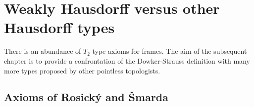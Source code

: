 \chapter{Weakly Hausdorff versus other Hausdorff types}

There is an abundance of $T_2$-type axioms for frames.
The aim of the subsequent chapter is to provide a confrontation of the
Dowker-Strauss definition with many more types proposed by other pointless
topologists.

\section{Axioms of Rosický and Šmarda}
